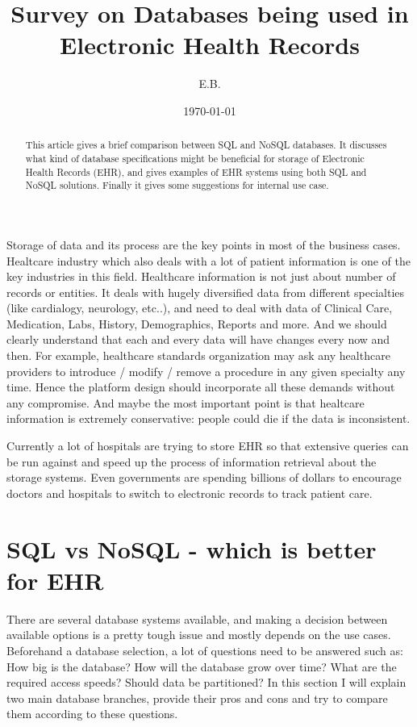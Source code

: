 \documentclass{article}
\begin{document}
\title{Survey on Databases being used in Electronic Health Records}   %
\author{E.B.}         %
\date{\today}    %
\maketitle

\begin{abstract}
This article gives a brief comparison between SQL and NoSQL databases. It discusses what kind of database specifications might be beneficial for storage of Electronic Health Records (EHR), and gives examples of EHR systems using both SQL and NoSQL solutions. Finally it gives some suggestions for internal use case. \\
\end{abstract} 

Storage of data and its process are the key points in most of the business cases.  Healtcare industry which also deals with a lot of patient information is one of the key industries in this field. Healthcare information is not just about number of records or entities. It deals with hugely diversified data from different specialties (like cardialogy, neurology, etc..), and need to deal with data of Clinical Care, Medication, Labs, History, Demographics, Reports and more. And we should clearly understand that each and every data will have changes every now and then. For example, healthcare standards organization may ask any healthcare providers to introduce / modify / remove a procedure in any given specialty any time. Hence the platform design should incorporate all these demands without any compromise\cite{online3}. And maybe the most important point is that healtcare information is extremely conservative: people could die if the data is inconsistent\cite{online4}.
 
Currently a lot of hospitals are trying to store EHR so that extensive queries can be run against and speed up the process of information retrieval about the storage systems. Even governments are spending billions of dollars to encourage doctors and hospitals to switch to electronic records to track patient care\cite{online5}.

\section{SQL vs NoSQL - which is better for EHR}

There are several database systems available, and making a decision between available options is a pretty tough issue and mostly depends on the use cases. Beforehand a database selection, a lot of questions need to be answered such as: How big is the database? How will the database grow over time? What are the required access speeds? Should data be partitioned? In this section I will explain two main database branches, provide their pros and cons and try to compare them according to these questions.
\end{document}
